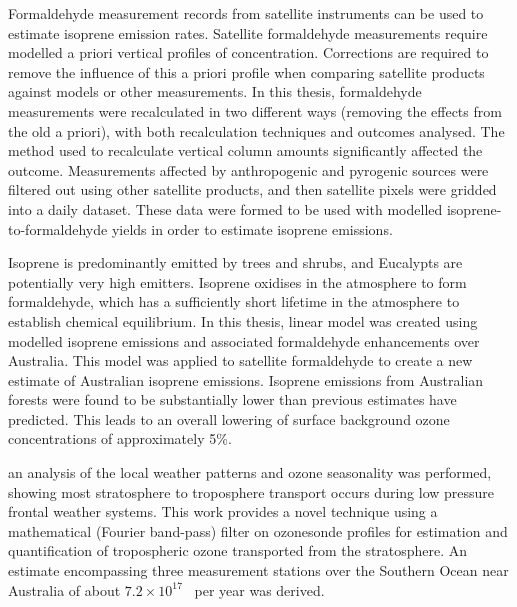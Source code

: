 %
Formaldehyde measurement records from satellite instruments can be used to estimate isoprene emission rates.
Satellite formaldehyde measurements require modelled a priori vertical profiles of concentration.
Corrections are required to remove the influence of this a priori profile when comparing satellite products against models or other measurements. 
In this thesis, formaldehyde measurements were recalculated in two different ways (removing the effects from the old a priori), with both recalculation techniques and outcomes analysed.
The method used to recalculate vertical column amounts significantly affected the outcome.
Measurements affected by anthropogenic and pyrogenic sources were filtered out using other satellite products, and then satellite pixels were gridded into a daily dataset.
These data were formed to be used with modelled isoprene-to-formaldehyde yields in order to estimate isoprene emissions.

%
Isoprene is predominantly emitted by trees and shrubs, and Eucalypts are potentially very high emitters. 
Isoprene oxidises in the atmosphere to form formaldehyde, which has a sufficiently short lifetime in the atmosphere to establish chemical equilibrium.
In this thesis,  linear model was created using modelled isoprene emissions and associated formaldehyde enhancements over Australia.
This model was applied to satellite formaldehyde to create a new estimate of Australian isoprene emissions.
Isoprene emissions from Australian forests were found to be substantially lower than previous estimates have predicted.
This leads to an overall lowering of surface background ozone concentrations of approximately 5\%.

%
 an analysis of the local weather patterns and ozone seasonality was performed, showing most stratosphere to troposphere transport occurs during low pressure frontal weather systems. 
This work provides a novel technique using a mathematical (Fourier band-pass) filter on ozonesonde profiles for estimation and quantification of tropospheric ozone transported from the stratosphere. 
An estimate encompassing three measurement stations over the Southern Ocean near Australia of about $7.2 \times 10^{17}$ \moleccm ~per year was derived.

